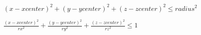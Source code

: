 \documentclass{article}
\begin{document}
$ (x - xcenter)^2 + (y - ycenter)^2 + (z - zcenter)^2 \le radius^2 $
\pagebreak

$ \frac{(x - xcenter)^2}{rx^2} + \frac{(y - ycenter)^2}{ry^2} + \frac{(z - zcenter)^2}{rz^2} \le 1 $
\pagebreak
\end{document}
